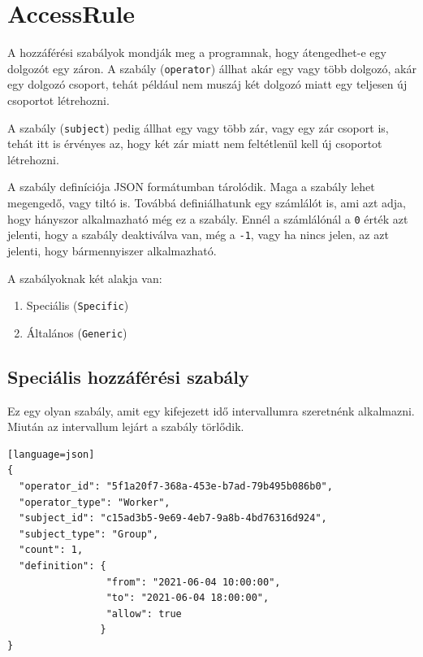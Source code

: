 \documentclass[a4paper,12pt]{thesis-ekf}
\theoremstyle{definition}
\begin{document}
		\section{AccessRule}
			A hozzáférési szabályok mondják meg a programnak, hogy átengedhet-e egy dolgozót egy záron. A szabály  (\texttt{operator}) állhat akár egy vagy több dolgozó, akár egy dolgozó csoport, tehát például nem muszáj két dolgozó miatt egy teljesen új csoportot létrehozni. 
			
			A szabály  (\texttt{subject}) pedig állhat egy vagy több zár, vagy egy zár csoport is, tehát itt is érvényes az, hogy két zár miatt nem feltétlenül kell új csoportot létrehozni.
			
			A szabály definíciója JSON formátumban tárolódik. Maga a szabály lehet megengedő, vagy tiltó is. Továbbá definiálhatunk egy számlálót is, ami azt adja, hogy hányszor alkalmazható még ez a szabály. Ennél a számlálónál a \texttt{0} érték azt jelenti, hogy a szabály deaktiválva van, még a \texttt{-1}, vagy ha nincs jelen, az azt jelenti, hogy bármennyiszer alkalmazható.
			
			A szabályoknak két alakja van:
			\begin{enumerate}
				\item Speciális (\texttt{Specific})
				\item Általános (\texttt{Generic})
			\end{enumerate}
		
			\subsection{Speciális hozzáférési szabály}
				Ez egy olyan szabály, amit egy kifejezett idő intervallumra szeretnénk alkalmazni. Miután az intervallum lejárt a szabály törlődik.
				
				\begin{lstlisting}[caption={Egy p\'elda speci\'alis szab\'aly l\'etrehoz\'asa},captionpos=b][language=json]
{
  "operator_id": "5f1a20f7-368a-453e-b7ad-79b495b086b0",
  "operator_type": "Worker",
  "subject_id": "c15ad3b5-9e69-4eb7-9a8b-4bd76316d924",
  "subject_type": "Group",
  "count": 1,
  "definition": {
                 "from": "2021-06-04 10:00:00",
                 "to": "2021-06-04 18:00:00",
                 "allow": true
                }
}
				\end{lstlisting}
				
\end{document}

